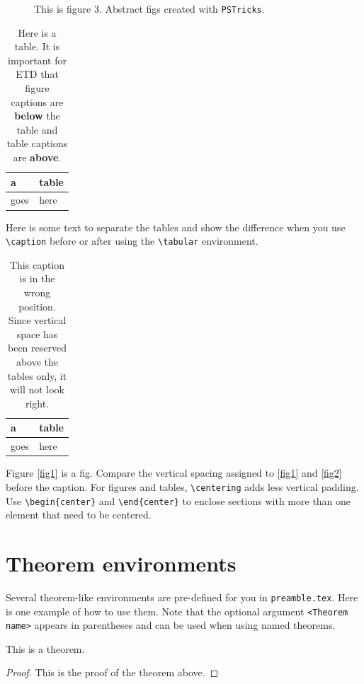 \begin{figure}[htpb]
\label{fig3}
\centering

\caption[This is figure 3.]{This is figure 3. Abstract figs created with \texttt{PSTricks}.}
\end{figure}

\begin{table}[h]
\caption[Here is a table.]{Here is a table. It is important for ETD that figure captions are \textbf{below} the table and table captions are \textbf{above}.}
\centering
\begin{tabular}{|l|l|}
\hline
a & table\\
\hline
goes& here\\
\hline
\end{tabular}
\end{table}
Here is some text to separate the tables and show the difference when you use \verb|\caption| before or after using the \verb|\tabular| environment.
\begin{table}[h]
\centering
\begin{tabular}{|l|l|}
\hline
a & table\\
\hline
goes& here\\
\hline
\end{tabular}
\caption[This caption is in the wrong position]{This caption is in the wrong position. Since vertical space has been reserved above the tables only, it will not look right.}
\end{table}

Figure \ref{fig1} is a fig. Compare the vertical spacing assigned to \cref{fig1} and \cref{fig2} before the caption. For figures and tables, \verb|\centering| adds less vertical padding. Use \verb|\begin{center}| and \verb|\end{center}| to enclose sections with more than one element that need to be centered. 

\section{Theorem environments}
Several theorem-like environments are pre-defined for you in \texttt{preamble.tex}. Here is one example of how to use them. Note that the optional argument \verb|<Theorem name>| appears in parentheses and can be used when using named theorems. 

\begin{Thm}
\label{mythm}
This is a theorem.
\end{Thm}
\begin{proof}
This is the proof of the theorem above.
\end{proof}


